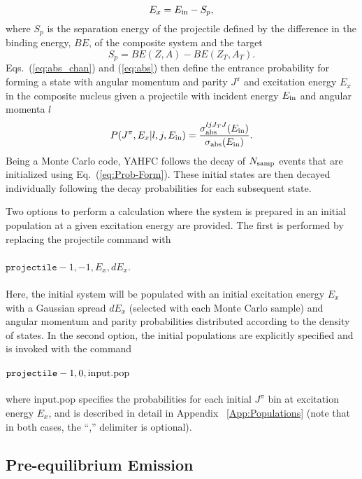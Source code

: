 \documentclass[
10pt,
showpacs,preprintnumbers,footinbib,
amsfonts,amsmath,amssymb,
aps,
prc,twocolumn,groupedaddress,superscriptaddress,
showkeys,
nofootinbib
]{revtex4-1}
\begin{document}
\begin{equation}
E_x = E_{\rm in} - S_p,
\end{equation}
where $S_p$ is the separation energy of the projectile defined by the difference in the binding energy, $BE$, of the composite system and the target
\begin{equation}
S_p = BE(Z,A) - BE(Z_T,A_T).
\end{equation}
Eqs.~(\ref{eq:abs_chan}) and (\ref{eq:abs}) then define the entrance probability for forming a state with angular momentum and parity $J^\pi$ and excitation energy $E_x$ in the composite nucleus given a projectile with incident energy $E_{\rm in}$ and angular momenta $l$
\begin{equation}
P(J^\pi,E_x|l,j,E_{\rm in}) = \frac{\sigma_{\rm abs}^{ljJ_TJ}(E_{\rm in})}{\sigma_{\rm abs} (E_{\rm in})}.
\label{eq:Prob-Form}
\end{equation}
Being a Monte Carlo code, YAHFC follows the decay of $N_{\rm samp}$ events that are initialized using Eq.~(\ref{eq:Prob-Form}). These initial states are then decayed individually following the decay probabilities for each subsequent state.  

Two options to perform a calculation where the system is prepared in an initial population at a given excitation energy are provided. The first is performed by replacing the projectile command with\\
\\
${\texttt{projectile}} -1, -1, E_x, dE_x$.\\
\\
Here, the initial system will be populated with an initial excitation energy $E_x$ with a Gaussian spread $dE_x$ (selected with each Monte Carlo sample) and angular momentum and parity probabilities distributed according to the density of states. In the second option, the initial populations are explicitly specified and is invoked with the command\\
\\
${\texttt{projectile}} -1, 0, {\rm input.pop}$\\
\\
where input.pop specifies the probabilities for each initial $J^\pi$ bin at excitation energy $E_x$, and is described in detail in Appendix ~\ref{App:Populations} (note that in both cases, the ``,'' delimiter is optional).

\subsection{Pre-equilibrium Emission}
\label{sec:Preeq}
\end{document}
